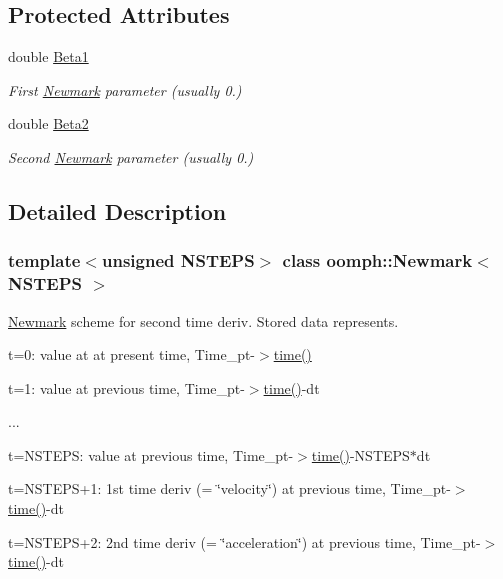 \subsection*{Protected Attributes}
\begin{DoxyCompactItemize}
\item 
double \hyperlink{classoomph_1_1Newmark_a916754e6f33077cf6c0e4f4b2f3cff09}{Beta1}
\begin{DoxyCompactList}\small\item\em First \hyperlink{classoomph_1_1Newmark}{Newmark} parameter (usually 0.) \end{DoxyCompactList}\item 
double \hyperlink{classoomph_1_1Newmark_a01274acab6f486732be1cc37fb5b40ce}{Beta2}
\begin{DoxyCompactList}\small\item\em Second \hyperlink{classoomph_1_1Newmark}{Newmark} parameter (usually 0.) \end{DoxyCompactList}\end{DoxyCompactItemize}


\subsection{Detailed Description}
\subsubsection*{template$<$unsigned N\+S\+T\+E\+PS$>$\newline
class oomph\+::\+Newmark$<$ N\+S\+T\+E\+P\+S $>$}

\hyperlink{classoomph_1_1Newmark}{Newmark} scheme for second time deriv. Stored data represents. 


\begin{DoxyItemize}
\item t=0\+: value at at present time, Time\+\_\+pt-\/$>$\hyperlink{classoomph_1_1TimeStepper_ab902086340e6b33c5114db30c1f644c1}{time()}
\item t=1\+: value at previous time, Time\+\_\+pt-\/$>$\hyperlink{classoomph_1_1TimeStepper_ab902086340e6b33c5114db30c1f644c1}{time()}-\/dt
\item ...
\item t=N\+S\+T\+E\+PS\+: value at previous time, Time\+\_\+pt-\/$>$\hyperlink{classoomph_1_1TimeStepper_ab902086340e6b33c5114db30c1f644c1}{time()}-\/\+N\+S\+T\+E\+P\+S$\ast$dt
\item t=N\+S\+T\+E\+P\+S+1\+: 1st time deriv (= \char`\"{}velocity\char`\"{}) at previous time, Time\+\_\+pt-\/$>$\hyperlink{classoomph_1_1TimeStepper_ab902086340e6b33c5114db30c1f644c1}{time()}-\/dt
\item t=N\+S\+T\+E\+P\+S+2\+: 2nd time deriv (= \char`\"{}acceleration\char`\"{}) at previous time, Time\+\_\+pt-\/$>$\hyperlink{classoomph_1_1TimeStepper_ab902086340e6b33c5114db30c1f644c1}{time()}-\/dt
\end{DoxyItemize}

